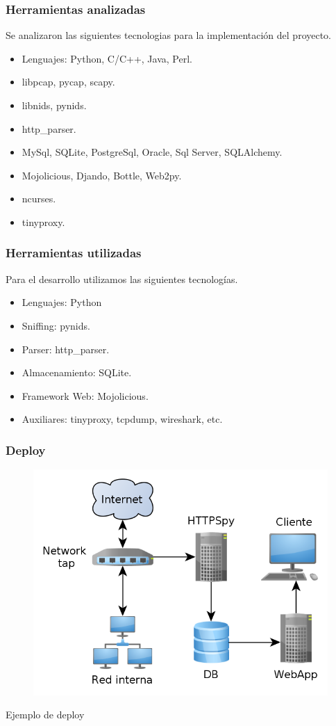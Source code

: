 \documentclass[10pt,a4paper]{beamer}
\begin{document}
\begin{frame}
	\frametitle{Herramientas analizadas}
	Se analizaron las siguientes tecnologias para la implementación del proyecto.
	\begin{itemize}
		\item Lenguajes: Python, C/C++, Java, Perl.
		\item libpcap, pycap, scapy.
		\item libnids, pynids.
		\item http\_parser.
		\item MySql, SQLite, PostgreSql, Oracle, Sql Server, SQLAlchemy.
		\item Mojolicious, Djando, Bottle, Web2py.
		\item ncurses.
		\item tinyproxy.
	\end{itemize}
	
\end{frame}


\begin{frame}

	\frametitle{Herramientas utilizadas}
	Para el desarrollo utilizamos las siguientes tecnologías.
	\begin{itemize}
		\item Lenguajes: Python
		\item Sniffing: pynids.
		\item Parser: http\_parser.
		\item Almacenamiento: SQLite.
		\item Framework Web: Mojolicious.
		\item Auxiliares: tinyproxy, tcpdump, wireshark, etc.
	\end{itemize}
	
\end{frame}


\begin{frame}

	\frametitle{Deploy}
	\begin{figure}[hbtp]
		\includegraphics[scale=0.3]{img/deploy.png}
	\end{figure}
	\begin{center}
		\large{Ejemplo de deploy}
	\end{center}
	
\end{frame}	
\end{document}
